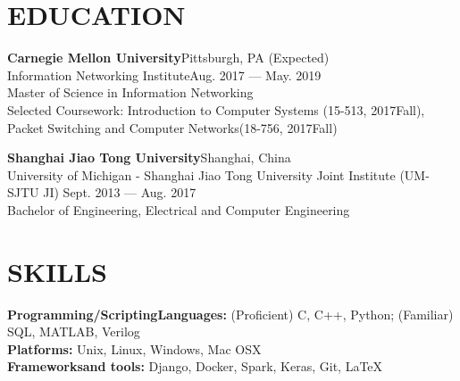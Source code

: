 \documentclass[margin,line,10pt]{res}
\begin{document}
\address{ $\bullet$ linkedin.com/in/hao-wu-710254128 $\bullet$ wu.hao.cz.21@gmail.com $\bullet$ (412)-616-6280}
 
\begin{resume}

\section{EDUCATION}
{
\small
\textbf{Carnegie Mellon University}\hfill Pittsburgh, PA (Expected) \\ Information Networking Institute\hfill Aug. 2017 --- May. 2019\\
Master of Science in Information Networking\\
{\small Selected Coursework: Introduction to Computer Systems (15-513, 2017Fall), Packet Switching and Computer Networks(18-756, 2017Fall)} 
}
\vspace{-.1 in}

{
\small
\textbf{Shanghai Jiao Tong University}\hfill Shanghai, China \\
University of Michigan - Shanghai Jiao Tong University Joint Institute (UM-SJTU JI) \hfill Sept. 2013 --- Aug. 2017\\
Bachelor of Engineering, Electrical and Computer Engineering
}
\vspace{-.05 in}
\section{SKILLS}
{\small \textbf{Programming/ScriptingLanguages:} (Proficient) C, C++, Python; (Familiar) SQL, MATLAB, Verilog}\\
{\small \textbf{Platforms:} Unix, Linux, Windows, Mac OSX}\\
{\small \textbf{Frameworksand tools:} Django, Docker, Spark, Keras, Git, \LaTeX}
\vspace{-.05 in}

\end{resume}
\end{document}
